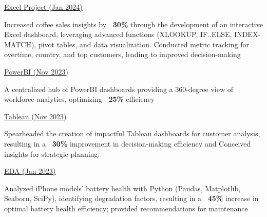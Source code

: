 \documentclass[]{awesome-cv}
\begin{document}
\begin{cventries}
	{\href{https://k-ashik.github.io/Khalid-The-Data-Analyst.github.io/}{Excel Project (Jan 2024)}}
	{\begin{cvitems}
		\item {Increased coffee sales insights by \textbf{~{}30\%} through the development of an interactive Excel dashboard, leveraging advanced functions (XLOOKUP, IF..ELSE, INDEX-MATCH), pivot tables, and data visualization. Conducted metric tracking for overtime, country, and top customers, leading to improved decision-making}
	\end{cvitems}}
	{\href{https://www.novypro.com/profile_projects/khalid-md-ashik}{PowerBI (Nov 2023)}}
	{\begin{cvitems}
		\item {A centralized hub of PowerBI dashboards providing a 360-degree
view of workforce analytics, optimizing \textbf{~{}25\%} efficiency}
	\end{cvitems}}
	{\href{https://public.tableau.com/app/profile/khalid.md.ashik/vizzes}{Tableau (Nov 2023)}}
	{\begin{cvitems}
		\item {Spearheaded the creation of impactful Tableau dashboards for customer analysis, resulting in a \textbf{~{}30\%} improvement in decision-making efficiency and Conceived insights for strategic planning.}
		\end{cvitems}}
	{\href{https://github.com/K-Ashik/Investigating-Battery-Health-Issues-in-iPhone-Models-An-Analysis-of-Charging-Patterns-and-iOS-Update}{EDA (Jan 2023)}}
	{\begin{cvitems}
		\item {Analyzed iPhone models' battery health with Python (Pandas, Matplotlib, Seaborn, SciPy), identifying degradation factors, resulting in a \textbf{~{}45\%} increase in optimal battery health efficiency; provided recommendations for maintenance}

\end{cvitems}}
\end{cventries}
\end{document}
